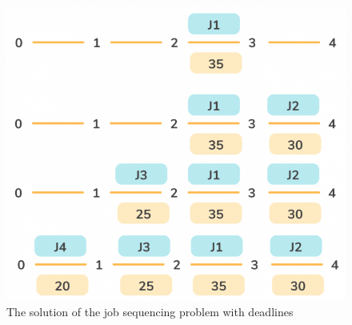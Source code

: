 \documentclass[a4paper,11pt]{book}
\begin{document}
\begin{figure}[ht]
	\centering
	\includegraphics[scale=0.35]{code/sort/pic/job2.png}
	\caption{The solution of the job sequencing problem with deadlines}
\end{figure}
\end{document}
